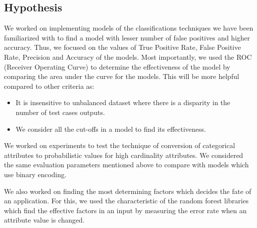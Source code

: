 \documentclass{article} %
\begin{document}
	\subsection{Hypothesis}
	We worked on implementing models of the classifications techniques we have been familiarized with to find a model with lesser number of false positives and higher accuracy. Thus, we focused on the values of True Positive Rate, False Positive Rate, Precision and Accuracy of the models. Most importantly, we used the ROC (Receiver Operating Curve) to determine the effectiveness of the model by comparing the area under the curve for the models. This will be more helpful compared to other criteria as:
	\begin{itemize}
		\item It is insensitive to unbalanced dataset where there is a disparity in the number of test cases outputs.  
		\item We consider all the cut-offs in a model to find its effectiveness.
	\end{itemize}
	
	We worked on experiments to test the technique of conversion of categorical attributes to probabilistic values for high cardinality attributes\cite{HighCard}. We considered the same evaluation parameters mentioned above to compare with models which use binary encoding. 
	
	We also worked on finding the most determining factors which decides the fate of an application. For this, we used the characteristic of the random forest libraries which find the effective factors in an input by measuring the error rate when an attribute value is changed. 
\end{document}
